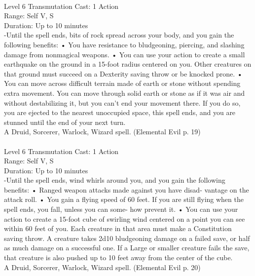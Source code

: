 \documentclass[10pt,twocolumn]{report}
\begin{document}
 \\
Level 6 \quad Transmutation \quad Cast: 1 Action\\
Range: Self \quad V, S\\
Duration: Up to 10 minutes \quad \\
-Until the spell ends, bits of rock spread across your body, and you gain the following benefits:
• You have resistance to bludgeoning, piercing, and slashing damage from nonmagical weapons.
• You can use your action to create a small earthquake on the ground in a 15-foot radius centered on you. Other creatures on that ground must succeed on a Dexterity saving throw or be knocked prone.
• You can move across difficult terrain made of earth or stone without spending extra movement. You can move through solid earth or stone as if it was air and without destabilizing it, but you can’t end your movement there. If you do so, you are ejected to the nearest unoccupied space, this spell ends, and you are stunned until the end of your next turn.\\
A Druid, Sorcerer, Warlock, Wizard spell. (Elemental Evil p. 19) \\


 \\
Level 6 \quad Transmutation \quad Cast: 1 Action\\
Range: Self \quad V, S\\
Duration: Up to 10 minutes \quad \\
-Until the spell ends, wind whirls around you, and you gain the following benefits:
• Ranged weapon attacks made against you have disad- vantage on the attack roll.
• You gain a flying speed of 60 feet. If you are still flying when the spell ends, you fall, unless you can some- how prevent it.
• You can use your action to create a 15-foot cube of swirling wind centered on a point you can see within 60 feet of you. Each creature in that area must make a Constitution saving throw. A creature takes 2d10 bludgeoning damage on a failed save, or half as much damage on a successful one. If a Large or smaller creature fails the save, that creature is also pushed up to 10 feet away from the center of the cube.\\
A Druid, Sorcerer, Warlock, Wizard spell. (Elemental Evil p. 20) \\
\end{document}
